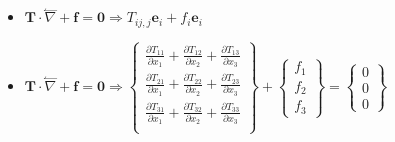 \documentclass[10pt, letterpaper]{article}
\begin{document}
\begin{itemize}
	\item $\bm{T} \cdot \overset{\leftharpoonup}{\nabla} + \bm{f} = \bm{0} \Rightarrow
		T_{ij,j} \bm{e}_i + f_i \bm{e}_i$
	\item $\bm{T} \cdot \overset{\leftharpoonup}{\nabla} + \bm{f} = \bm{0} \Rightarrow 
		\begin{Bmatrix}
			\frac{\partial T_{11}}{\partial x_1} + \frac{\partial T_{12}}{\partial x_2} +\frac{\partial T_{13}}{\partial x_3}  \\
			\frac{\partial T_{21}}{\partial x_1} + \frac{\partial T_{22}}{\partial x_2} +\frac{\partial T_{23}}{\partial x_3}  \\
			\frac{\partial T_{31}}{\partial x_1} + \frac{\partial T_{32}}{\partial x_2} +\frac{\partial T_{33}}{\partial x_3}  \\
		\end{Bmatrix} + \begin{Bmatrix}
			f_1 \\ f_2 \\ f_3
		\end{Bmatrix} = \begin{Bmatrix}
			0 \\ 0 \\ 0
		\end{Bmatrix}$
\end{itemize}
 
\end{document}
